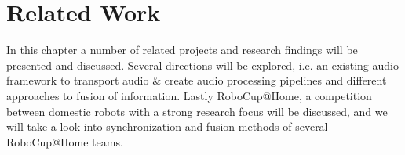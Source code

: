 
\chapter{Related Work}

In this chapter a number of related projects and research findings will be presented and discussed. 
Several directions will be explored, i.e. an existing audio framework to transport audio \& create audio processing pipelines and different approaches to fusion of information.
Lastly RoboCup@Home, a competition between domestic robots with a strong research focus will be discussed, and we will take a look into synchronization and fusion methods of several RoboCup@Home teams.



